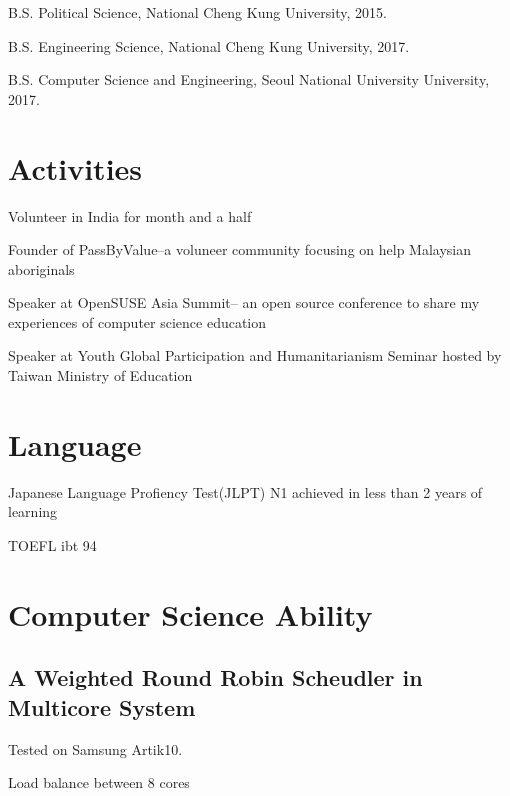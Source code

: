 \documentclass[letterpaper]{article}
\renewenvironment{itemize}{
  \begin{list}{}{
    \setlength{\leftmargin}{1.5em}
  }
}{
  \end{list}
}
\begin{document}
\begin{itemize}
  \item B.S. Political Science, National Cheng Kung University, 2015.

  \item B.S. Engineering Science, National Cheng Kung University, 2017.

  \item B.S. Computer Science and Engineering, Seoul National University University, 2017.
\end{itemize}


\section*{Activities}
\begin{itemize}
	\item Volunteer in India for month and a half
	\item Founder of PassByValue--a voluneer community focusing on help Malaysian aboriginals
	\item Speaker at OpenSUSE Asia Summit-- an open source conference to share my experiences of computer science education
	\item Speaker at Youth Global Participation and Humanitarianism Seminar hosted by Taiwan Ministry of Education
\end{itemize}

\section*{Language}
\begin{itemize}
	\item Japanese Language Profiency Test(JLPT) N1 achieved in less than 2 years of learning
	\item TOEFL ibt 94
\end{itemize}

\section*{Computer Science Ability}

\subsection*{A Weighted Round Robin Scheudler in Multicore System}
\begin{itemize}
	\item Tested on Samsung Artik10.
	\item Load balance between 8 cores
\end{itemize}
\end{document}
